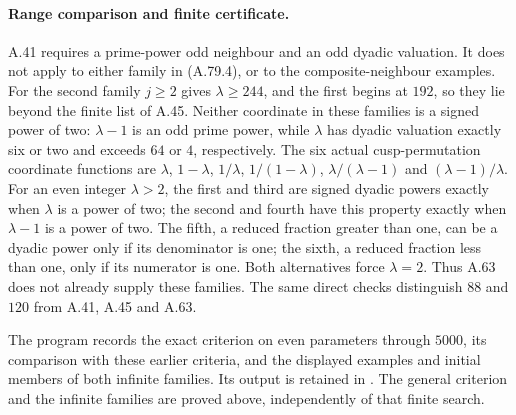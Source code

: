 \paragraph{Range comparison and finite certificate.}
A.41 requires a prime-power odd neighbour and an odd
dyadic valuation.  It does not apply to either family
in (A.79.4), or to the composite-neighbour examples.
For the second family $j\ge2$ gives $\lambda\ge244$,
and the first begins at $192$, so they lie beyond the
finite list of A.45.  Neither coordinate in these families
is a signed power of two: $\lambda-1$ is an odd prime power,
while $\lambda$ has dyadic valuation exactly six or two
and exceeds $64$ or $4$, respectively.
The six actual cusp-permutation coordinate functions are
$\lambda$, $1-\lambda$, $1/\lambda$, $1/(1-\lambda)$,
$\lambda/(\lambda-1)$ and $(\lambda-1)/\lambda$.
For an even integer $\lambda>2$, the first and third are
signed dyadic powers exactly when $\lambda$ is a power
of two; the second and fourth have this property exactly
when $\lambda-1$ is a power of two.
The fifth, a reduced fraction greater than one, can be a
dyadic power only if its denominator is one; the sixth,
a reduced fraction less than one, only if its numerator
is one.  Both alternatives force $\lambda=2$.
Thus A.63 does not already supply these families.
The same direct checks distinguish $88$ and $120$ from
A.41, A.45 and A.63.

The program 
records the exact criterion on even parameters through
$5000$, its comparison with these earlier criteria, and
the displayed examples and initial members of both
infinite families.  Its output is retained in
.
The general criterion and the infinite families are
proved above, independently of that finite search.
